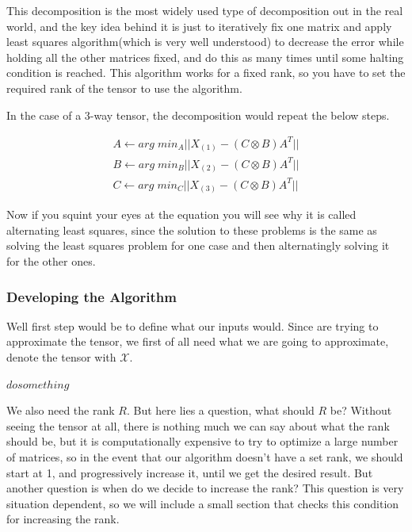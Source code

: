 \documentclass[11pt]{article}
\newcommand\0{\mathbf{0}}
\newcommand\<{\langle}
\renewcommand\>{\rangle}
\begin{document}
This decomposition is the most widely used type of decomposition out in the real world, and the key 
idea behind it is just to iteratively fix one matrix and apply least squares algorithm(which is very well understood) to decrease the error while holding all the other matrices fixed, and do this as many times until some halting condition is reached. This algorithm works for a fixed rank, so 
you have to set the required rank of the tensor to use the algorithm.

In the case of a 3-way tensor, the decomposition would repeat the below steps.

\begin{align*}
    A\leftarrow arg\;min_{A} || X_{(1)}- (C \otimes B) A^{T}||\\
    B\leftarrow arg\;min_{B} || X_{(2)}- (C \otimes B) A^{T}||\\
    C\leftarrow arg\;min_{C} || X_{(3)}- (C \otimes B) A^{T}||
\end{align*}

Now if you squint your eyes at the equation you will see why it is called alternating least squares, since the solution to these problems is the same as solving the least squares problem for one case and then alternatingly solving it for the other ones. 

\subsubsection{Developing the Algorithm}

Well first step would be to define what our inputs would. Since are trying to approximate the tensor, we first of all need what we are going to approximate, denote the tensor with $\mathcal{X}$.\\

\begin{algorithm}
\begin{algorithmic}
\State $do something$
\EndProcedure
\end{algorithmic}
\end{algorithm}

We also need the rank $R$. But here lies a question, what should $R$ be? Without seeing the tensor at all, there is nothing much we can say about what the rank should be, but it is computationally expensive to try to optimize a large number of matrices, so in the event that our algorithm doesn't have a set rank, we should start at 1, and progressively increase it, until we get the desired result. But another question is when do we decide to increase the rank? This question is very situation dependent, so we will include a small section that checks this condition for increasing the rank.
\end{document}

